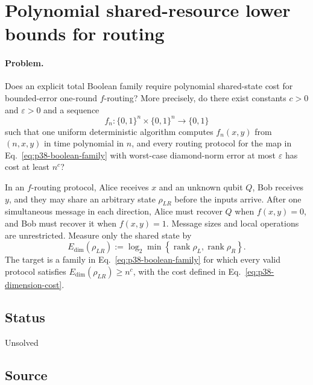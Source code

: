 \section{Polynomial shared-resource lower bounds for routing}
\label{sec:problem-38}

\paragraph{Problem.}
Does an explicit total Boolean family require polynomial shared-state cost for
bounded-error one-round $f$-routing?  More precisely, do there exist constants
$c>0$ and $\varepsilon>0$ and a sequence
\begin{equation}
  f_n:\{0,1\}^n\times\{0,1\}^n\longrightarrow\{0,1\}
  \label{eq:p38-boolean-family}
\end{equation}
such that one uniform deterministic algorithm computes $f_n(x,y)$ from
$(n,x,y)$ in time polynomial in $n$, and every routing protocol for the map in
Eq.~\eqref{eq:p38-boolean-family} with worst-case diamond-norm error at most
$\varepsilon$ has cost at least $n^c$?

In an $f$-routing protocol, Alice receives $x$ and an unknown qubit $Q$, Bob
receives $y$, and they may share an arbitrary state $\rho_{LR}$ before the
inputs arrive.  After one simultaneous message in each direction, Alice must
recover $Q$ when $f(x,y)=0$, and Bob must recover it when $f(x,y)=1$.  Message
sizes and local operations are unrestricted.  Measure only the shared state
by
\begin{equation}
  E_{\mathrm{dim}}(\rho_{LR})
  :=\log_2\min\!\left\{
    \operatorname{rank}\rho_L,\operatorname{rank}\rho_R
  \right\}.
  \label{eq:p38-dimension-cost}
\end{equation}
The target is a family in Eq.~\eqref{eq:p38-boolean-family} for which every
valid protocol satisfies $E_{\mathrm{dim}}(\rho_{LR})\geq n^c$, with the cost
defined in Eq.~\eqref{eq:p38-dimension-cost}.

\subsection*{Status}

Unsolved

\subsection*{Source}

